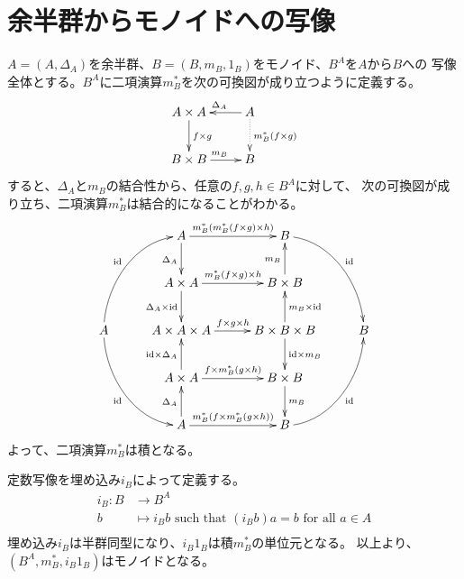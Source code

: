 \section{余半群からモノイドへの写像}\label{s1:集合からモノイドへの写像} %
	$A=(A,\Delta_A)$を余半群、$B=(B,m_B,1_B)$をモノイド、$B^A$を$A$から$B$への
	写像全体とする。$B^A$に二項演算$m_B^*$を次の可換図が成り立つように定義する。
	\begin{equation}\xymatrix{ %
		A \times A \ar[d]^{f \times g} & A \ar[l]_{\Delta_A} \ar@{.>}[d]^{m_B^*(f \times g)} \\
		B \times B \ar[r]^{m_B} & B \\
	}\end{equation} %
	すると、$\Delta_A$と$m_B$の結合性から、任意の$f,g,h\in B^A$に対して、
	次の可換図が成り立ち、二項演算$m_B^*$は結合的になることがわかる。
	\begin{equation}\label{eq:誘導された二項演算の結合性}\xymatrix@C+1ex{
		& A \ar[d]_{\Delta_A} \ar[r]^{m_B^*(m_B^*(f\times g)\times h)}
		& B \ar@(r,u)[rdd]^{\myid} 
		\\
		& A\times A \ar[d]_{\Delta_A\times \myid} \ar[r]^{m_B^*(f\times g)\times h}
		& B\times B \ar[u]^{m_B}
		\\
	A \ar@(u,l)[ruu]^{\myid} \ar@(d,l)[rdd]_{\myid} 
		& A\times A\times A \ar[r]^{f\times g\times h}
		& B\times B\times B \ar[u]_{m_B\times \myid} \ar[d]^{\myid\times m_B}
		& B 
		\\
		& A\times A \ar[u]^{\myid\times \Delta_A} \ar[r]^{f\times m_B^*(g\times h)}
		& B\times B \ar[d]^{m_B}
		\\
		& A \ar[u]^{\Delta_A} \ar[r]^{m_B^*(f\times m_B^*(g\times h))}
		& B \ar@(r,d)[ruu]_{\myid}
		\\
	}\end{equation}
	よって、二項演算$m_B^*$は積となる。
	
	定数写像を埋め込み$i_B$によって定義する。
	\begin{equation}\label{eq:constant-map}\begin{split} %
		i_B: B &\to B^A \\
			b &\mapsto i_Bb \text{ such that } (i_Bb)a = b \text{ for all }a\in A \\
	\end{split}\end{equation} %
	埋め込み$i_B$は半群同型になり、$i_B1_B$は積$m_B^*$の単位元となる。
	以上より、$(B^A,m_B^*,i_B1_B)$はモノイドとなる。

